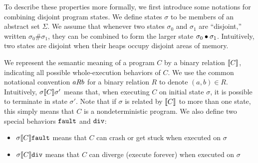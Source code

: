 \begin{comment}
In standard Separation
Logic~\cite{io00,reynolds02,yang:fossacs02,coy07}, there are two
locality properties, known as Safety Monotonicity and the Frame
Property, that together imply soundness of the frame rule.  Safety
Monotonicity says that any time a program executes safely in a certain
state, the same program must also execute safely in any larger
state~--- in other words, unused resources cannot cause a program to
crash. The Frame Property says that if a program executes safely on a
small state, then any terminating execution of the program on a larger
state can be tracked back to some terminating execution on the small
state by assuming that the extra added state has no effect and is
unchanged. Furthermore, there is a third property, called Termination
Monotonicity, that is required whenever we are interested in reasoning
about divergence (nontermination).  This property says that if a
program executes safely and never diverges on a small state, then it
cannot diverge on any larger state.
\end{comment}

To describe these properties more formally, we first 
introduce some notations for combining disjoint program states. 
We define states $\sigma$ to be members of
an abstract set $\Sigma$. We assume that whenever two states
$\sigma_0$ and $\sigma_1$ are ``disjoint,'' written $\sigma_0 \#
\sigma_1$, they can be combined to form the larger state $\sigma_0 \dt
\sigma_1$. Intuitively, two states are disjoint when their heaps occupy
disjoint areas of memory.

We represent the semantic meaning of a program $C$ by a binary
relation $\den{C}$, indicating all possible whole-execution behaviors
of $C$. We use the common notational convention
$\relate{R}{a}{b}$ for a binary relation $R$ to denote $(a,b) \in
R$. Intuitively, $\relate{\den{C}}{\sigma}{\sigma'}$ means that, when
executing $C$ on initial state $\sigma$, it is possible to terminate
in state $\sigma'$.  Note that if $\sigma$ is related by $\den{C}$ to
more than one state, this simply means that $C$ is a nondeterministic
program.
We also define two special behaviors $\fault$ and $\dvg$:
\begin{itemize}
\item $\relate{\den{C}}{\sigma}{\fault}$ means that $C$ can crash or get
stuck when executed on $\sigma$
\item $\relate{\den{C}}{\sigma}{\dvg}$ means that $C$ can diverge (execute
forever) when executed on $\sigma$
\end{itemize}


